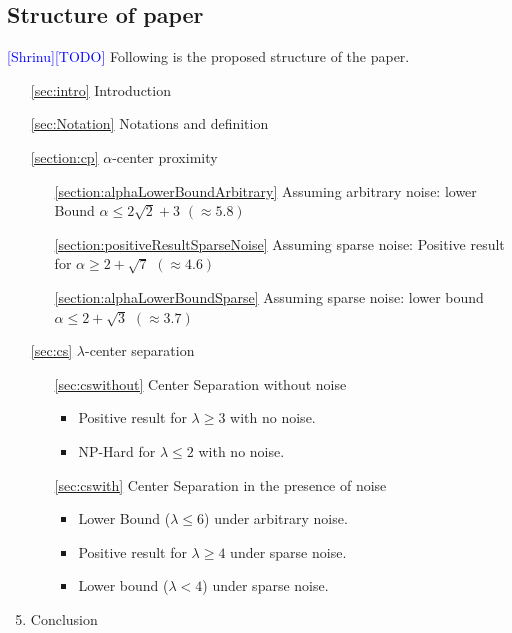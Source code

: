 \documentclass[anon,12pt]{colt2016} %
\newcommand{\todo}{\textcolor{blue}{[TODO]}\xspace}
\newcommand{\shrinu}{\textcolor{blue}{[Shrinu]}\xspace}
\begin{document}
\subsection{Structure of paper}
\shrinu\todo Following is the proposed structure of the paper.
\vspace{-0.1in}\begin{enumerate}
\setlength\itemsep{0em}
\item[\ref{sec:intro}] Introduction
\item[\ref{sec:Notation}] Notations and definition
\item[\ref{section:cp}] $\alpha$-center proximity	\vspace{-0.1in}
	\begin{enumerate}[leftmargin=32pt]
	\renewcommand{\labelenumii}{\theenumii}
	\renewcommand{\theenumii}{\theenumi.\arabic{enumii}.}
	\setlength\itemsep{0em}
	\item[\ref{section:alphaLowerBoundArbitrary}] Assuming arbitrary noise: lower Bound $\alpha \le 2\sqrt{2} + 3$ $(\approx 5.8)$
	\item[\ref{section:positiveResultSparseNoise}] Assuming sparse noise: Positive result for $\alpha \ge 2+\sqrt{7}$ $(\approx 4.6)$
	\item[\ref{section:alphaLowerBoundSparse}] Assuming sparse noise: lower bound $\alpha \le 2+\sqrt{3}$ $(\approx 3.7)$
	\end{enumerate}
\item[\ref{sec:cs}] $\lambda$-center separation \vspace{-0.1in}
	\begin{enumerate}[leftmargin=32pt]
	\renewcommand{\labelenumii}{\theenumii}
	\renewcommand{\theenumii}{\theenumi.\arabic{enumii}.}
	\setlength\itemsep{0em}
	\item[\ref{sec:cswithout}] Center Separation without noise
	\begin{itemize}
	\item Positive result for $\lambda \ge 3$ with no noise.
	\item NP-Hard for $\lambda \le 2$ with no noise.
	\end{itemize}
	\item[\ref{sec:cswith}] Center Separation in the presence of noise \begin{itemize}
	\item Lower Bound ($\lambda \le 6$) under arbitrary noise.
	\item Positive result for $\lambda \ge 4$ under sparse noise.
	\item Lower bound ($\lambda < 4$) under sparse noise.
	\end{itemize}
	\end{enumerate}
\item Conclusion
\end{enumerate}
\end{document}
